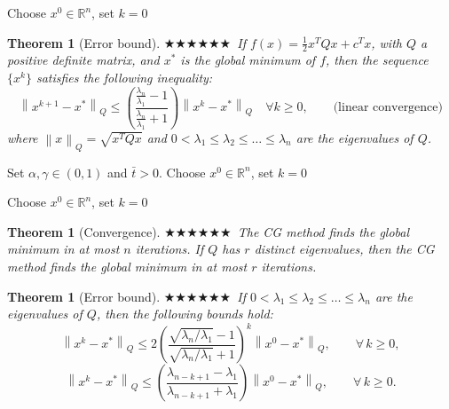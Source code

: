 \documentclass[11pt,a4paper]{article}
\newcommand{\R}{\mathbb{R}}
\newcommand{\norm}[1]{\left\lVert #1 \right\rVert}
\theoremstyle{breakdef}
\theoremstyle{breakplain}
\newtheorem{theorem}[definition]{Theorem}
\theoremstyle{remark}
\newcommand{\imp}[1]{\textcolor{impcolor}{%
  \ifcase#1\or$\bigstar$\or$\bigstar\bigstar$\or$\bigstar\bigstar\bigstar$\fi}\ }
\begin{document}
\begin{algorithm}[H]
\caption{\imp{3}Gradient method}
Choose $x^0 \in \R^n$, set $k = 0$\;
\end{algorithm}

\begin{theorem}[Error bound]
    \imp{2}If $f(x) = \frac{1}{2}x^TQx + c^Tx$, with $Q$ a positive definite matrix, and $x^*$ is the global minimum of $f$, then the sequence $\{x^k\}$ satisfies the following inequality:
    \[
        \norm{x^{k+1}-x^*}_Q \le \left(\frac{\frac{\lambda_n}{\lambda_1}-1}{\frac{\lambda_n}{\lambda_1}+1}\right)\norm{x^k-x^*}_Q \quad \forall k \ge 0, \qquad \text{(linear convergence)}
    \]
    where $\norm{x}_Q = \sqrt{x^TQx}$ and $0 < \lambda_1 \le \lambda_2 \le \dots \le \lambda_n$ are the eigenvalues of $Q$.
\end{theorem}

\begin{algorithm}[H]
\caption{\imp{3}Gradient method with the Armijo inexact line search}
Set $\alpha, \gamma \in (0,1)$ and $\bar{t} > 0$. Choose $x^0 \in \R^n$, set $k = 0$\;
\end{algorithm}

\begin{algorithm}[H]
\caption{\imp{3}Conjugate gradient method for quadratic functions}
Choose $x^0 \in \R^n$, set $k = 0$\;
\end{algorithm}

\begin{theorem}[Convergence]
    \imp{3}The CG method finds the global minimum in at most $n$ iterations.
    If $Q$ has $r$ distinct eigenvalues, then the CG method finds the global minimum in at most $r$ iterations.
\end{theorem}

\begin{theorem}[Error bound]
    \imp{2}If $0 < \lambda_1 \le \lambda_2 \le \dots \le \lambda_n$ are the eigenvalues of $Q$, then the following bounds hold:
    \[
        \norm{x^k - x^*}_Q \le 2\left(\frac{\sqrt{\lambda_n/\lambda_1} - 1}{\sqrt{\lambda_n/\lambda_1} + 1}\right)^k \norm{x^0 - x^*}_Q, \qquad \forall\, k \ge 0,
    \]
    \[
        \norm{x^k - x^*}_Q \le \left(\frac{\lambda_{n-k+1} - \lambda_1}{\lambda_{n-k+1} + \lambda_1}\right) \norm{x^0 - x^*}_Q, \qquad \forall\, k \ge 0.
    \]
\end{theorem}
\end{document}
